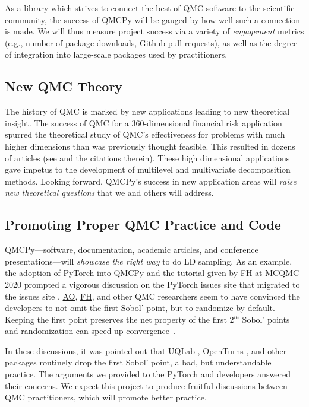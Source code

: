 \documentclass[11pt]{NSFamsart}
\newcommand{\FH}{\hyperlink{FHlink}{FH}\xspace}
\newcommand{\AO}{\hyperlink{AOlink}{AO}\xspace}
\begin{document}
As a library which strives to connect the best of QMC software to the scientific community, the success of QMCPy will be gauged by how well such a connection is made. We will thus measure project success via a variety of \textit{engagement} metrics (e.g., number of package downloads, Github pull requests), as well as the degree of integration into large-scale packages used by practitioners.

\subsection{New QMC Theory}
The history of QMC is marked by new applications leading to new theoretical insight.  The success of QMC for a $360$-dimensional financial risk application \cite{PasTra95} spurred the theoretical study of QMC's effectiveness for problems with much higher dimensions than was previously thought feasible.  This resulted in dozens of articles (see \cite{NovWoz10a,DicEtal14a} and the citations therein).  These high dimensional applications gave impetus to the development of multilevel \cite{Gil15a} and multivariate decomposition \cite{KuoEtal17a} methods. Looking forward, QMCPy's success in new application areas will \emph{raise new theoretical questions} that we and others will address.

\subsection{Promoting Proper QMC Practice and Code}
QMCPy---software, documentation, academic articles, and conference presentations---will \emph{showcase the right way} to do LD sampling.  As an example, the adoption of PyTorch into QMCPy and the tutorial given by FH at MCQMC 2020 \cite{MCQMC2020QMCPyTut} prompted a vigorous discussion on the PyTorch issues site \cite{PyTorchFirstPt2020a} that migrated to the  issues site \cite{scipySobol2020a}.  \AO, \FH, and other QMC researchers seem to have convinced the developers to not omit the first Sobol' point, but to randomize by default.  Keeping the first point preserves the net property of the first $2^m$ Sobol' points and randomization can speed up convergence~\cite{owen2020dropping}.

In these discussions, it was pointed out that UQLab \cite{UQLab2014}, OpenTurns \cite{OpenTURNS}, and other packages routinely drop the first Sobol' point, a bad, but understandable practice.  The arguments we provided to the PyTorch and  developers answered their concerns.  We expect this project to produce fruitful discussions between QMC practitioners, which will promote better practice.
\end{document}
